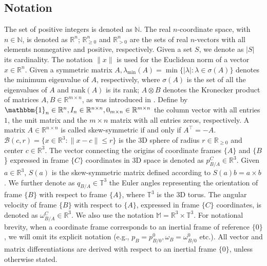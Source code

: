 \subsection{Notation}

The set of positive integers is denoted as $\mathbb{N}$. The real $n$-coordinate
space, with $n\in\mathbb{N}$, is denoted as $\mathbb{R}^n$;
$\mathbb{R}^n_{\geq 0}$ and $\mathbb{R}^n_{> 0}$ are the sets of real
$n$-vectors with all elements nonnegative and positive, respectively. Given a
set $S$, we denote as $\lvert S\lvert$ its cardinality. The notation $\|x\|$
is used for the Euclidean norm of a vector $x \in \mathbb{R}^n$. Given a
symmetric matrix $A, \lambda_{\text{min}}(A) = \min \{|\lambda| : \lambda \in \sigma(A) \}$
denotes the minimum eigenvalue of $A$, respectively, where $\sigma(A)$ is the
set of all the eigenvalues of $A$ and $\text{rank}(A)$ is its rank;
$A \otimes B$ denotes the Kronecker product of matrices $A, B \in \mathbb{R}^{m \times n}$,
as was introduced in \cite{horn_jonshon}. Define by $\mathbbm{1}_n \in \mathbb{R}^n, I_n \in \mathbb{R}^{n \times n}, 0_{m \times n} \in \mathbb{R}^{m \times n}$
the column vector with all entries $1$, the unit matrix and the $m \times n$
matrix with all entries zeros, respectively.
A matrix $A \in \mathbb{R}^{n \times n}$ is called skew-symmetric if and only
if $A^\top = -A$. $\mathcal{B}(c,r) = \{x \in \mathbb{R}^3: \|x-c\| \leq r\}$
is the $3$D sphere of radius $r \in \mathbb{R}_{\ge 0}$ and center
$c\in\mathbb{R}^{3}$.
The vector connecting the origins of coordinate frames $\{A\}$ and $\{B$\}
expressed in frame $\{C\}$ coordinates in $3$D space is denoted as
$p^{\scriptscriptstyle C}_{{\scriptscriptstyle B/A}}\in{\mathbb{R}}^{3}$.
Given $a\in\mathbb{R}^3$, $S(a)$ is the skew-symmetric matrix
defined according to $S(a)b = a\times b$. We further denote as
$q_{\scriptscriptstyle B/A}\in\mathbb{T}^3$ the Euler angles representing
the orientation of frame $\{B\}$ with respect to frame $\{A\}$, where
$\mathbb{T}^3$ is the $3$D torus. The angular velocity of frame $\{B\}$ with
respect to $\{A\}$, expressed in frame $\{C\}$ coordinates, is denoted as
$\omega^{\scriptscriptstyle C}_{\scriptscriptstyle B/A}\in \mathbb{R}^{3}$.
We also use the notation $\mathbb{M} = \mathbb{R}^3\times \mathbb{T}^3$.
For notational brevity, when a coordinate frame corresponds to an inertial frame
of reference $\{0\}$, we will omit its explicit notation
(e.g., $p_{\scriptscriptstyle B} = p^{\scriptscriptstyle 0}_{\scriptscriptstyle B/0},
\omega_{\scriptscriptstyle B} = \omega^{\scriptscriptstyle 0}_{\scriptscriptstyle B/0}$ etc.).
All vector and matrix differentiations are derived with respect to an inertial
frame $\{0\}$, unless otherwise stated.

